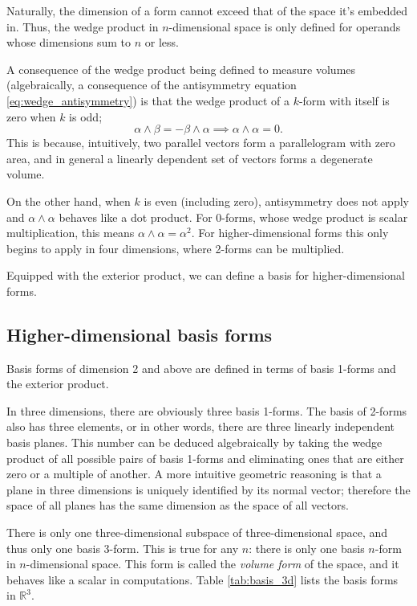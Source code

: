 \documentclass[utf8,english]{gradu3}
\begin{document}
Naturally, the dimension of a form cannot exceed that of the space it's embedded in.
Thus, the wedge product in $n$-dimensional space
is only defined for operands whose dimensions sum to $n$ or less.

A consequence of the wedge product being defined to measure volumes
(algebraically, a consequence of the antisymmetry equation \eqref{eq:wedge_antisymmetry})
is that the wedge product of a $k$-form with itself is zero when $k$ is odd;
\[
  \alpha \wedge \beta = -\beta \wedge \alpha
  \implies \alpha \wedge \alpha = 0.
\]
This is because, intuitively, two parallel vectors
form a parallelogram with zero area,
and in general a linearly dependent set of vectors
forms a degenerate volume.

On the other hand, when $k$ is even (including zero),
antisymmetry does not apply and $\alpha \wedge \alpha$ behaves like a dot product.
For 0-forms, whose wedge product is scalar multiplication,
this means $\alpha \wedge \alpha = \alpha^2$.
For higher-dimensional forms this only begins to apply in four dimensions,
where 2-forms can be multiplied.

Equipped with the exterior product,
we can define a basis for higher-dimensional forms.


\subsection{Higher-dimensional basis forms}\label{sec:basis_higher}

Basis forms of dimension 2 and above
are defined in terms of basis 1-forms and the exterior product.

In three dimensions, there are obviously three basis 1-forms.
The basis of 2-forms also has three elements,
or in other words, there are three linearly independent basis planes.
This number can be deduced algebraically
by taking the wedge product of all possible pairs of basis 1-forms
and eliminating ones that are either zero or a multiple of another.
A more intuitive geometric reasoning is that 
a plane in three dimensions is uniquely identified by its normal vector;
therefore the space of all planes has the same dimension as the space of all vectors.

There is only one three-dimensional subspace of three-dimensional space,
and thus only one basis 3-form.
This is true for any $n$:
there is only one basis $n$-form in $n$-dimensional space.
This form is called the \textit{volume form} of the space,
and it behaves like a scalar in computations.
Table \ref{tab:basis_3d} lists the basis forms in $\mathbb{R}^3$.
\end{document}
